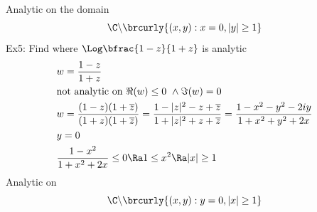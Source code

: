 Analytic on the domain
\[ \C\backslash\brcurly{(x,y):x=0,|y|\geq1} \]
Ex5: Find where $\Log\bfrac{1-z}{1+z}$ is analytic
\begin{align*}
    &w=\frac{1-z}{1+z}\\
    &\text{not analytic on }\Re(w)\leq 0\ \wedge\Im(w)=0\\
    &w=\frac{(1-z)(1+\overline{z})}{(1+z)(1+\overline{z})}=\frac{1-|z|^2-z+\overline{z}}{1+|z|^2+z+\overline{z}}=\frac{1-x^2-y^2-2iy}{1+x^2+y^2+2x}\\
    &y=0\\
    &\frac{1-x^2}{1+x^2+2x}\leq0\Ra 1\leq x^2\Ra |x|\geq 1
\end{align*}
Analytic on
\[ \C\backslash\brcurly{(x,y):y=0,|x|\geq1} \]

